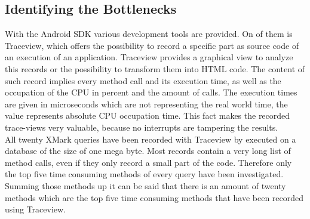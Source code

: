 \subsection{Identifying the Bottlenecks}
\label{sec:identifying-the-bottlenecks}
With the Android SDK various development tools are provided.
On of them is Traceview, which offers the possibility to record a specific part as source code of an execution of an application.
Traceview provides a graphical view to analyze this records or the possibility to transform them into HTML code.
The content of such record implies every method call and its execution time, as well as the occupation of the CPU in percent and the amount of calls.
The execution times are given in microseconds which are not representing the real world time, the value represents absolute CPU occupation time.
This fact makes the recorded trace-views very valuable, because no interrupts are tampering the results.\\
All twenty XMark queries have been recorded with Traceview by executed on a database of the size of one mega byte.
Most records contain a very long list of method calls, even if they only record a small part of the code.
Therefore only the top five time consuming methods of every query have been investigated.
Summing those methods up it can be said that there is an amount of twenty methods which are the top five time consuming methods that have been recorded using Traceview.
%
